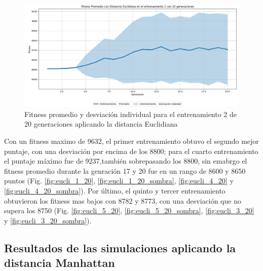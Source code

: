\documentclass[conference]{IEEEtran}
\begin{document}
\begin{figure}[H]
    \centering
    \includegraphics[width=1\linewidth]{Euclidiana/Fitness_individual_20/Fitness_2_Eucli_20Gen_Sombra.png}
    \caption{Fitness promedio y desviación individual para el entrenamiento 2 de 20 generaciones aplicando la distancia Euclidiana}
    \label{fig:Fitnes_ecu_2_20_inv_sombra}
\end{figure}
Con un fitness maximo de 9632, el primer entrenamiento obtuvo el segundo mejor puntaje, con una desviación por encima de los 8800; para el cuarto entrenamiento el puntaje máximo fue de 9237,también sobrepasando los 8800, sin emabrgo el fitness promedio durante la genración 17 y 20 fue en un rango de 8600 y 8650 puntos (Fig. \ref{fig:eucli_1_20}, \ref{fig:eucli_1_20_sombra}, \ref{fig:eucli_4_20} y \ref{fig:eucli_4_20_sombra}). Por último, el quinto y tercer entrenamiento obtuvieron los fitness mas bajos con 8782 y 8773, con una desviación que no supera los 8750 (Fig. \ref{fig:eucli_5_20}, \ref{fig:eucli_5_20_sombra}, \ref{fig:eucli_3_20} y \ref{fig:eucli_3_20_sombra}).



\subsection{Resultados de las simulaciones aplicando la distancia Manhattan}
\end{document}

